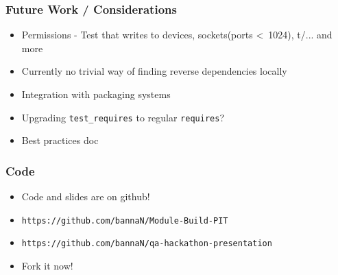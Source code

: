 \documentclass[10pt]{beamer}
\begin{document}
\begin{frame}[fragile]
\frametitle{Future Work / Considerations}
\begin{itemize}
\item Permissions - Test that writes to devices, sockets(ports \textless \ 1024), t/... and more
\item Currently no trivial way of finding reverse dependencies locally
\item Integration with packaging systems
\item Upgrading \verb|test_requires| to regular \verb|requires|?
\item Best practices doc
\end{itemize}
\end{frame}

\begin{frame}[fragile]
\frametitle{Code}
\begin{itemize}
\item Code and slides are on github!
\item \verb|https://github.com/bannaN/Module-Build-PIT|
\item \verb|https://github.com/bannaN/qa-hackathon-presentation|
\item Fork it now!
\end{itemize}
\end{frame}
\end{document}
